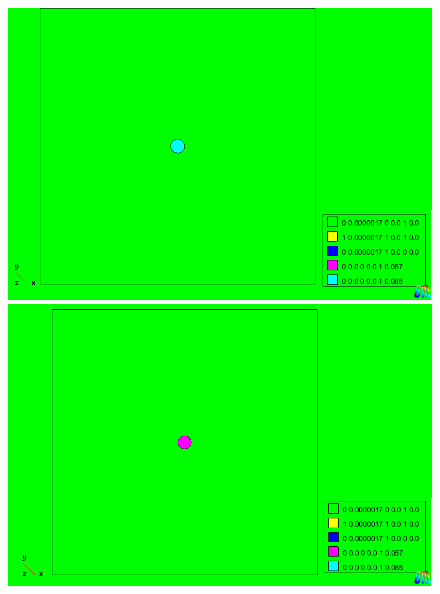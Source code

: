 \documentclass[spanish]{beamer}
\begin{document}
\begin{frame}\begin{center}
\begin{figure}[htbp] 
\centering 
\includegraphics[scale=0.18]{../img/100m/100_condiciones_fijar_velocidad_fondo_pozos_arriba_izquierda} 
\includegraphics[scale=0.18]{../img/100m/100_condiciones_fijar_velocidad_fondo_pozos_abajo_derecha}
\label{fondo_pozos_detalles} 
\end{figure} 
\end{center}
\end{frame}
\end{document}
